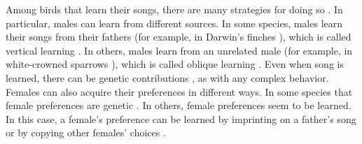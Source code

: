 \documentclass[12pt]{article}
\begin{document}
Among birds that learn their songs, there are many strategies for doing so  \cite{Beecher:2005ly}. 
In particular, males can learn from different sources. In some species, males learn their songs from their fathers (for example, in Darwin's finches \cite{Grant:1996ve}), which is called vertical learning \cite{Cavalli-Sforza:1981bc}. In others, males learn from an unrelated male (for example, in white-crowned sparrows \cite{Baptista:1988qf}), which is called oblique learning \cite{Cavalli-Sforza:1981bc}. Even when song is learned, there can be genetic contributions \cite{Forstmeier:2009cr,Slabbekoorn:2002kl,Airey:2000dq}, as with any complex behavior.
Females can also acquire their preferences in different ways. In some species that female preferences are genetic \cite{Verzijden:2005vn}. In others, female preferences seem to be learned. In this case, a female's preference can be learned by imprinting on a father's song \cite{Verzijden:2005vn} or by copying other females' choices \cite{Kirkpatrick:1994vn}. 
\end{document}
